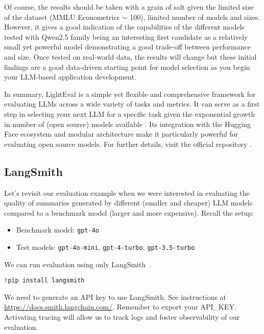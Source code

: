 Of course, the results should be taken with a grain of salt given the limited size of the dataset (MMLU Econometrics $\sim$ 100), limited number of models and sizes. However, it gives a good indication of the capabilities of the different models tested with Qwen2.5 family being an interesting first candidate as a relatively small yet powerful model demonstrating a good trade-off between performance and size. Once tested on real-world data, the results will change but these initial findings are a good data-driven starting point for model selection as you begin your LLM-based application development.

In summary, LightEval is a simple yet flexible and comprehensive framework for evaluating LLMs across a wide variety of tasks and metrics. It can serve as a first step in selecting your next LLM for a specific task given the exponential growth in number of (open source) models available . Its integration with the Hugging Face ecosystem and modular architecture make it particularly powerful for evaluating open source models. For further details, visit the official repository .
\subsection{LangSmith}

Let's revisit our evaluation example when we were interested in evaluating the quality of summaries generated by different (smaller and cheaper) LLM models compared to a benchmark model (larger and more expensive). Recall the setup:

\begin{itemize}
\item Benchmark model: \texttt{gpt-4o}
\item Test models: \texttt{gpt-4o-mini}, \texttt{gpt-4-turbo}, \texttt{gpt-3.5-turbo}
\end{itemize}

We can run evaluation using only LangSmith~.
\begin{verbatim}
!pip install langsmith
\end{verbatim}
We need to generate an API key to use LangSmith. See instructions at \url{https://docs.smith.langchain.com/}. Remember to export your API\_KEY. Activating tracing will allow us to track logs and foster observability of our evaluation.

